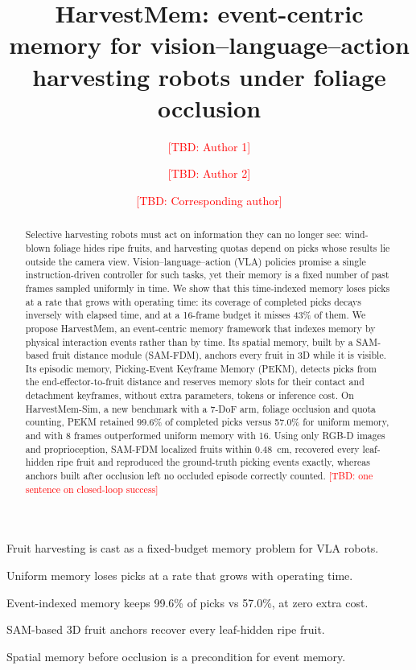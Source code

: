 \documentclass[preprint,review,12pt,authoryear]{elsarticle}
\newcommand{\tbd}[1]{\textcolor{red}{[TBD: #1]}}
\begin{document}
\begin{frontmatter}

\title{HarvestMem: event-centric memory for vision--\hspace{0pt}language--\hspace{0pt}action harvesting robots under foliage occlusion}

\author[a]{\tbd{Author 1}}
\author[a]{\tbd{Author 2}}
\author[a]{\tbd{Corresponding author}}
\cortext[cor1]{Corresponding author. E-mail: \tbd{email}}
\address[a]{\tbd{Affiliation, city, postcode, country}}

\begin{abstract}
Selective harvesting robots must act on information they can no longer see: wind-blown foliage hides ripe fruits, and harvesting quotas depend on picks whose results lie outside the camera view. Vision--language--action (VLA) policies promise a single instruction-driven controller for such tasks, yet their memory is a fixed number of past frames sampled uniformly in time. We show that this time-indexed memory loses picks at a rate that grows with operating time: its coverage of completed picks decays inversely with elapsed time, and at a 16-frame budget it misses 43\% of them. We propose HarvestMem, an event-centric memory framework that indexes memory by physical interaction events rather than by time. Its spatial memory, built by a SAM-based fruit distance module (SAM-FDM), anchors every fruit in 3D while it is visible. Its episodic memory, Picking-Event Keyframe Memory (PEKM), detects picks from the end-effector-to-fruit distance and reserves memory slots for their contact and detachment keyframes, without extra parameters, tokens or inference cost. On HarvestMem-Sim, a new benchmark with a 7-DoF arm, foliage occlusion and quota counting, PEKM retained 99.6\% of completed picks versus 57.0\% for uniform memory, and with 8 frames outperformed uniform memory with 16. Using only RGB-D images and proprioception, SAM-FDM localized fruits within 0.48~cm, recovered every leaf-hidden ripe fruit and reproduced the ground-truth picking events exactly, whereas anchors built after occlusion left no occluded episode correctly counted. \tbd{one sentence on closed-loop success}
\end{abstract}

\begin{highlights}
\item Fruit harvesting is cast as a fixed-budget memory problem for VLA robots.
\item Uniform memory loses picks at a rate that grows with operating time.
\item Event-indexed memory keeps 99.6\% of picks vs 57.0\%, at zero extra cost.
\item SAM-based 3D fruit anchors recover every leaf-hidden ripe fruit.
\item Spatial memory before occlusion is a precondition for event memory.
\end{highlights}


\end{frontmatter}
\end{document}
